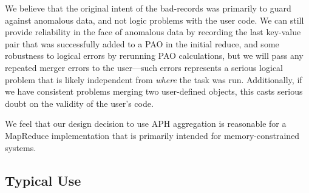 \documentclass[10pt,letter,final,article,twocolumn]{article} %
\begin{document}
We believe that  the original intent of the bad-records was primarily to guard against anomalous data, and not logic problems with the user code. We can still provide reliability in the face of anomalous data by recording the last key-value pair that was successfully added to a PAO in the initial reduce, and some robustness to logical errors by rerunning PAO calculations, but we will  pass any repeated merger errors to the user---such errors represents a serious logical problem that is likely independent from \emph{where} the task was run. Additionally, if we have consistent problems merging two user-defined objects, this casts serious doubt on the validity of the user's code.

We feel that our design decision to use APH aggregation is reasonable for a MapReduce implementation that is primarily intended for memory-constrained systems.

\subsection{Typical Use}
\end{document}
